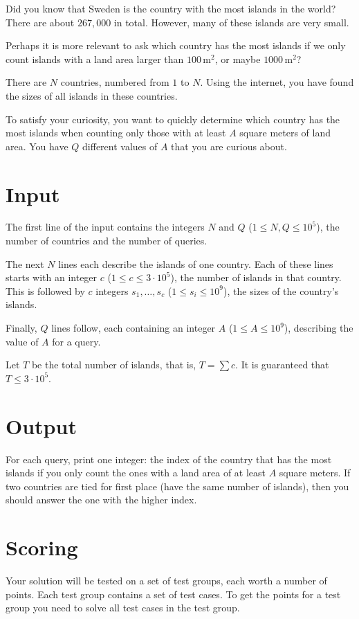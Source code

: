 \noindent

Did you know that Sweden is the country with the most islands in the world?
There are about $267{,}000$ in total.
However, many of these islands are very small.

Perhaps it is more relevant to ask which country has the most islands if we only count islands with a land area larger than $100\,\text{m}^2$, or maybe $1000\,\text{m}^2$?

There are $N$ countries, numbered from $1$ to $N$.
Using the internet, you have found the sizes of all islands in these countries.

To satisfy your curiosity, you want to quickly determine which country has the most islands when counting only those with at least $A$ square meters of land area.
You have $Q$ different values of $A$ that you are curious about.


\section*{Input}

The first line of the input contains the integers $N$ and $Q$
($1 \leq N, Q \leq 10^5$),
the number of countries and the number of queries.

The next $N$ lines each describe the islands of one country.
Each of these lines starts with an integer $c$
($1 \leq c \leq 3 \cdot 10^5$),
the number of islands in that country.
This is followed by $c$ integers
$s_1, \dots, s_c$
($1 \leq s_i \leq 10^9$),
the sizes of the country's islands.

Finally, $Q$ lines follow, each containing an integer $A$
($1 \leq A \leq 10^9$), describing the value of $A$ for a query.

Let $T$ be the total number of islands, that is, $T = \sum c$.
It is guaranteed that $T \leq 3 \cdot 10^5$.


\section*{Output}
For each query, print one integer: the index of the country that has the most islands if you only count the ones with a land area of at least $A$
square meters. If two countries are tied for first place (have the same number of islands), then you should answer the one with the higher index.


\section*{Scoring}
Your solution will be tested on a set of test groups, each worth a number of points. Each test group contains
a set of test cases. To get the points for a test group you need to solve all test cases in the test group.

